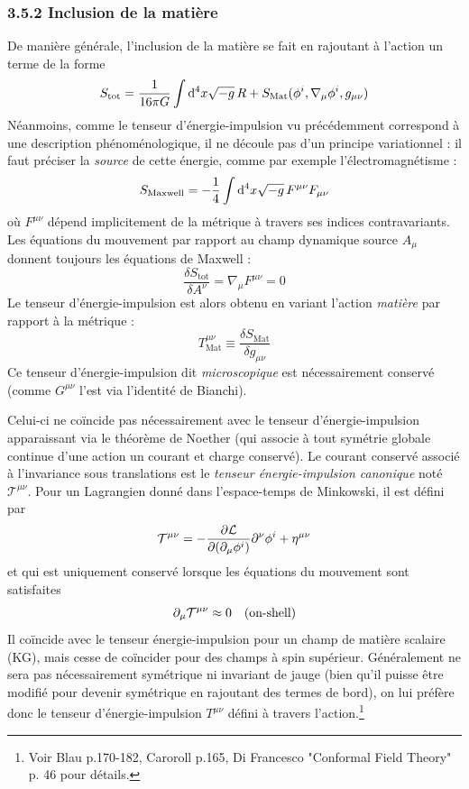\subsubsection{3.5.2 Inclusion de la matière}
De manière générale, l'inclusion de la matière se fait en rajoutant à l'action un terme de la forme
\begin{equation}
    S_{\text{tot}} = \frac{1}{16\pi G} \int \mathrm{d}^4 x \sqrt{-g}\, R + S_{\text{Mat}}(\phi^i , \nabla_\mu \phi^i, g_{\mu \nu})
\end{equation}
Néanmoins, comme le tenseur d'énergie-impulsion vu précédemment correspond à une description phénoménologique, il ne découle pas d'un principe variationnel : il faut préciser la \emph{source} de cette énergie, comme par exemple l'électromagnétisme :
\begin{equation}
    S_{\text{Maxwell}} = -\frac{1}{4} \int \mathrm{d}^4 x \sqrt{-g} \, F^{\mu \nu}F_{\mu\nu}
\end{equation}
où $F^{\mu \nu}$ dépend implicitement de la métrique à travers ses indices contravariants. Les équations du mouvement par rapport au champ dynamique source $A_\mu$ donnent toujours les équations de Maxwell :
\begin{equation}
    \frac{\delta S_{\text{tot}}}{\delta A^{\nu}} = \nabla_{\mu} F^{\mu \nu} = 0
\end{equation}
Le tenseur d'énergie-impulsion est alors obtenu en variant l'action \emph{matière} par rapport à la métrique :
\begin{equation}
    T^{\mu\nu}_\text{Mat} \equiv \frac{\delta S_\text{Mat}}{\delta g_{\mu\nu}}
\end{equation}
Ce tenseur d'énergie-impulsion dit \emph{microscopique} est nécessairement conservé (comme $G^{\mu\nu}$ l'est via l'identité de Bianchi).
\begin{rmk}
    Celui-ci ne coïncide pas nécessairement avec le tenseur d'énergie-impulsion apparaissant via le théorème de Noether (qui associe à tout symétrie globale continue d'une action un courant et charge conservé). Le courant conservé associé à l'invariance sous translations est le \emph{tenseur énergie-impulsion canonique} noté $\mathcal{T}^{\mu\nu}$. Pour un Lagrangien donné dans l'espace-temps de Minkowski, il est défini par
    \begin{equation}
        \mathcal{T}^{\mu\nu} = - \frac{\partial \mathcal{L}}{\partial (\partial_\mu \phi^i)} \partial^\nu \phi^i + \eta^{\mu\nu}
    \end{equation}
    et qui est uniquement conservé lorsque les équations du mouvement sont satisfaites
    \begin{equation}
        \partial_\mu \mathcal{T}^{\mu\nu} \approx 0 \quad \text{(on-shell)}
    \end{equation}
     Il coïncide avec le tenseur énergie-impulsion pour un champ de matière scalaire (KG), mais cesse de coïncider pour des champs à spin supérieur. Généralement ne sera pas nécessairement symétrique ni invariant de jauge (bien qu'il puisse être modifié pour devenir symétrique en rajoutant des termes de bord), on lui préfère donc le tenseur d'énergie-impulsion $T^{\mu\nu}$ défini à travers l'action.\footnote{Voir Blau p.170-182, Caroroll p.165, Di Francesco "Conformal Field Theory" p. 46 pour détails.}
\end{rmk}

